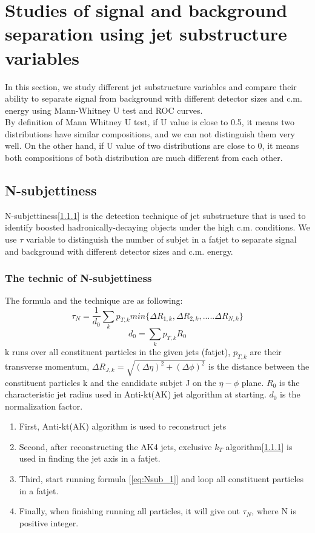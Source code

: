 \section{Studies of signal and background separation using jet substructure variables}
In this section, we study different jet substructure variables and compare their ability to separate signal from background with different detector sizes and c.m. energy using Mann-Whitney U test and ROC curves.\\

By definition of Mann Whitney U test, if U value is close to 0.5, it means two distributions have similar compositions, and we can not distinguish them very well. On the other hand, if U value of two distributions are close to 0, it means both compositions of both distribution are much different from each other.\\

\subsection{N-subjettiness}
N-subjettiness[\ref{}] is the detection technique of jet substructure that is used to identify boosted hadronically-decaying objects under the high c.m. conditions. We use $\tau$ variable to distinguish the number of subjet in a fatjet to separate signal and background with different detector sizes and c.m. energy.\\

\subsubsection{The technic of N-subjettiness}
The formula and the technique are as following:\\
\begin{equation}\label{eq:Nsub_1}
\tau_{N}=\frac{1}{d_{0}}\sum_{k}p_{T,k} min\{\Delta R_{1,k},\Delta R_{2,k},.....\Delta R_{N,k}\}
\end{equation}
\begin{equation}
d_{0}=\sum_{k}p_{T,k} R_{0}
\end{equation}
k runs over all constituent particles in the given jets (fatjet), $p_{T,k}$ are their transverse momentum, $\Delta R_{J,k}=\sqrt{(\Delta \eta)^{2}+(\Delta \phi)^{2}}$ is the distance between the constituent particles k and the candidate subjet J on the $\eta-\phi$ plane. $R_{0}$ is the characteristic jet radius used in Anti-kt(AK) jet algorithm at starting. $d_{0}$ is the normalization factor.\\
\begin{enumerate}
\item First, Anti-kt(AK) algorithm is used to reconstruct jets
\item Second, after reconstructing the AK4 jets, exclusive $k_{T}$ algorithm[\ref{}] is used in finding the jet axis in a fatjet.
\item Third, start running formula [\ref{eq:Nsub_1}] and loop all constituent particles in a fatjet.
\item Finally, when finishing running all particles, it will give out $\tau_{N}$, where N is positive integer. 
\end{enumerate}

